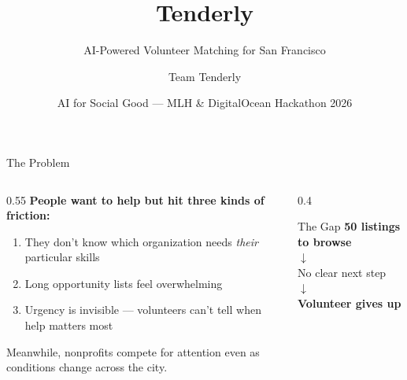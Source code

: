 \documentclass[aspectratio=169, 12pt]{beamer}
\title{Tenderly}
\subtitle{AI-Powered Volunteer Matching for San Francisco}
\author{Team Tenderly}
\date{AI for Social Good --- MLH \& DigitalOcean Hackathon 2026}
\begin{document}
\begin{frame}{The Problem}
  \begin{columns}[T]
    \begin{column}{0.55\textwidth}
      \textbf{People want to help but hit three kinds of friction:}
      \begin{enumerate}
        \item They don't know which organization needs \emph{their} particular skills
        \item Long opportunity lists feel overwhelming
        \item Urgency is invisible --- volunteers can't tell when help matters most
      \end{enumerate}
      \vspace{0.3cm}
      {\small Meanwhile, nonprofits compete for attention even as conditions change across the city.}
    \end{column}
    \begin{column}{0.4\textwidth}
      \begin{block}{The Gap}
        \centering
        \textbf{50 listings to browse}\\
        $\downarrow$\\[0.15cm]
        \alert{No clear next step}\\[0.15cm]
        $\downarrow$\\
        \textbf{Volunteer gives up}
      \end{block}
    \end{column}
  \end{columns}
\end{frame}
\end{document}
